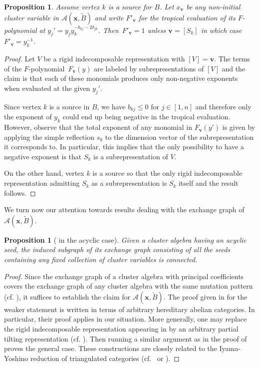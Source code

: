 \documentclass[12pt]{amsart}
\newtheorem{proposition}[theorem]{Proposition}
\newcommand{\bfv}{\mathbf{v}}
\newcommand{\bfx}{\mathbf{x}}
\newcommand{\cA}{\mathcal{A}}
\begin{document}
  \begin{proposition}
    \label{prop:principal F-polynomials}
    Assume vertex $k$ is a source for $B$.
    Let $x_\bfv$ be any non-initial cluster variable in $\cA(\bfx,\widetilde{B})$ and write $F'_\bfv$ for the tropical evaluation of its $F$-polynomial at $y_j'=y_jy_k^{-b_{kj}-2\delta_{jk}}$.
    Then~$F'_\bfv=1$ unless $\bfv=[S_k]$ in which case $F'_\bfv=y_k^{-1}$.
  \end{proposition}
  \begin{proof}
    Let $V$ be a rigid indecomposable representation with $[V]=\bfv$.
    The terms of the $F$-polynomial~$F_\bfv(y)$ are labeled by subrepresentations of $[V]$ and the claim is that each of these monomials produces only non-negative exponents when evaluated at the given $y_j'$.

    Since vertex $k$ is a source in $B$, we have $b_{kj}\leq 0$ for $j\in[1,n]$ and therefore only the exponent of $y_k$ could end up being negative in the tropical evaluation.
    However, observe that the total exponent of any monomial in $F_\bfv(y')$ is given by applying the simple reflection $s_k$ to the dimension vector of the subrepresentation it corresponds to.
    In particular, this implies that the only possibility to have a negative exponent is that $S_k$ is a subrepresentation of $V$.

    On the other hand, vertex $k$ is a source so that the only rigid indecomposable representation admitting $S_k$ as a subrepresentation is $S_k$ itself and the result follows.
  \end{proof}

  We turn now our attention towards results dealing with the exchange graph of $\cA(\bfx,\widetilde{B})$.

  \begin{proposition}[{\cite[Conjecture 3.10]{reading-speyer}} in the acyclic case]
    Given a cluster algebra having an acyclic seed, the induced subgraph of its exchange graph consisting of all the seeds containing any fixed collection of cluster variables is connected.
  \end{proposition}
  \begin{proof}
    Since the exchange graph of a cluster algebra with principal coefficients covers the exchange graph of any cluster algebra with the same mutation pattern (cf. \cite{fomin-zelevinsky4}), it suffices to establish the claim for $\cA(\bfx,\widetilde{B})$.
    The proof given in \cite[Corollary 3]{caldero-keller2} for the weaker statement \cite[Conjecture 4.14(3)]{FZ03} is written in terms of arbitrary hereditary abelian categories.
    In particular, their proof applies in our situation.
    More generally, one may replace the rigid indecomposable representation appearing in \cite[Section 5.4]{caldero-keller2} by an arbitrary partial tilting representation (cf. \cite[Proposition 3]{happel-rickard-schofield}).
    Then running a similar argument as in the proof of \cite[Theorem 6]{caldero-keller2} proves the general case.
    These constructions are closely related to the Iyama-Yoshino reduction of triangulated categories (cf.~\cite[Section 4]{iyama-yoshino} or \cite[Section 7.2]{keller}).
  \end{proof}
\end{document}

